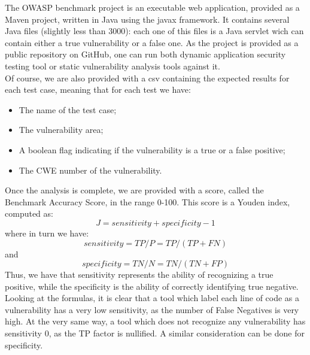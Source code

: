 \documentclass[../Report.tex]{subfiles}
\begin{document}
The OWASP benchmark project is an executable web application, provided as a Maven project, written in Java using the javax framework. It contains several Java files (slightly less than 3000): each one of this files is a Java servlet wich can contain either a true vulnerability or a false one. As the project is provided as a public repository on GitHub, one can run both dynamic application security testing tool or static vulnerability analysis tools against it. \\
Of course, we are also provided with a csv containing the expected results for each test case, meaning that for each test we have:
\begin{itemize}
	\item The name of the test case;
	\item The vulnerability area;
	\item A boolean flag indicating if the vulnerability is a true or a false positive;
	\item The CWE number of the vulnerability.
\end{itemize}
Once the analysis is complete, we are provided with a score, called the Benchmark Accuracy Score, in the range 0-100. This score is a Youden index, computed as:
\[ J = sensitivity + specificity - 1 \]
where in turn we have:
\[ sensitivity = TP/P = TP/(TP + FN) \]
and
\[ specificity = TN/N = TN/(TN + FP) \]
Thus, we have that sensitivity represents the ability of recognizing a true positive, while the specificity is the ability of correctly identifying true negative. Looking at the formulas, it is clear that a tool which label each line of code as a vulnerability has a very low sensitivity, as the number of False Negatives is very high. At the very same way, a tool which does not recognize any vulnerability has sensitivity 0, as the TP factor is nullified. A similar consideration can be done for specificity.
\end{document}
